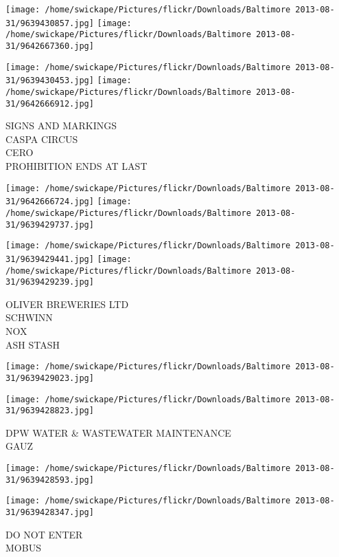 \documentclass[10pt,letterpaper]{article}
\begin{document}
\texttt{[image: /home/swickape/Pictures/flickr/Downloads/Baltimore 2013-08-31/9639430857.jpg]}
\texttt{[image: /home/swickape/Pictures/flickr/Downloads/Baltimore 2013-08-31/9642667360.jpg]}

\texttt{[image: /home/swickape/Pictures/flickr/Downloads/Baltimore 2013-08-31/9639430453.jpg]}
\texttt{[image: /home/swickape/Pictures/flickr/Downloads/Baltimore 2013-08-31/9642666912.jpg]}

SIGNS AND MARKINGS\\
CASPA CIRCUS\\
CERO\\
PROHIBITION ENDS AT LAST\\
\pagebreak

\texttt{[image: /home/swickape/Pictures/flickr/Downloads/Baltimore 2013-08-31/9642666724.jpg]}
\texttt{[image: /home/swickape/Pictures/flickr/Downloads/Baltimore 2013-08-31/9639429737.jpg]}

\texttt{[image: /home/swickape/Pictures/flickr/Downloads/Baltimore 2013-08-31/9639429441.jpg]}
\texttt{[image: /home/swickape/Pictures/flickr/Downloads/Baltimore 2013-08-31/9639429239.jpg]}

OLIVER BREWERIES LTD\\
SCHWINN\\
NOX\\
ASH STASH\\
\pagebreak

\texttt{[image: /home/swickape/Pictures/flickr/Downloads/Baltimore 2013-08-31/9639429023.jpg]}

\vspace{0.25in}
\texttt{[image: /home/swickape/Pictures/flickr/Downloads/Baltimore 2013-08-31/9639428823.jpg]}

DPW WATER \& WASTEWATER MAINTENANCE\\
GAUZ\\
\pagebreak

\texttt{[image: /home/swickape/Pictures/flickr/Downloads/Baltimore 2013-08-31/9639428593.jpg]}

\vspace{0.25in}
\texttt{[image: /home/swickape/Pictures/flickr/Downloads/Baltimore 2013-08-31/9639428347.jpg]}

DO NOT ENTER\\
MOBUS\\
\pagebreak
\end{document}

